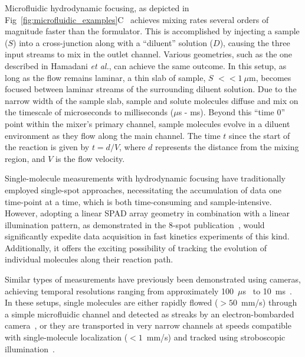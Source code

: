 Microfluidic hydrodynamic focusing, as depicted in Fig~\ref{fig:microfluidic_examples}C~\cite{knight_PRL_1998,lipman_science_2003,gambin_LoC_2010,wunderlich_NP_2013} achieves mixing rates several orders of magnitude faster than the formulator. 
This is accomplished by injecting a sample ($S$) into a cross-junction along with a \enquote{diluent} solution ($D$), causing the three input streams to mix in the outlet channel. 
Various geometries, such as the one described in Hamadani \textit{et al.}\cite{hamadani_BJ_2008}, can achieve the same outcome. 
In this setup, as long as the flow remains laminar, a thin slab of sample, $S$ $<<1~\mu$m, becomes focused between laminar streams of the surrounding diluent solution. 
Due to the narrow width of the sample slab, sample and solute molecules diffuse and mix on the timescale of microseconds to milliseconds ($\mu$s - ms). 
Beyond this \enquote{time 0} point within the mixer's primary channel, sample molecules evolve in a diluent environment as they flow along the main channel. 
The time $t$ since the start of the reaction is given by $t = d/V$, where $d$ represents the distance from the mixing region, and $V$ is the flow velocity.

Single-molecule measurements with hydrodynamic focusing have traditionally employed single-spot approaches, necessitating the accumulation of data one time-point at a time, which is both time-consuming and sample-intensive. 
However, adopting a linear \ac{SPAD} array geometry in combination with a linear illumination pattern, as demonstrated in the 8-spot publication~\cite{ingargiola_SPIE_2017}, would significantly expedite data acquisition in fast kinetics experiments of this kind. 
Additionally, it offers the exciting possibility of tracking the evolution of individual molecules along their reaction path.

Similar types of measurements have previously been demonstrated using cameras, achieving temporal resolutions ranging from approximately 100~$\mu$s~\cite{oikawa_SR_2013,oikawa_JPCB_2015} to 10~ms~\cite{fontana_LoC_2019}. 
In these setups, single molecules are either rapidly flowed ($>50$~mm/s) through a simple microfluidic channel and detected as streaks by an electron-bombarded camera~\cite{oikawa_SR_2013,oikawa_JPCB_2015}, or they are transported in very narrow channels at speeds compatible with single-molecule localization ($<1$~mm/s) and tracked using stroboscopic illumination~\cite{fontana_LoC_2019}.

